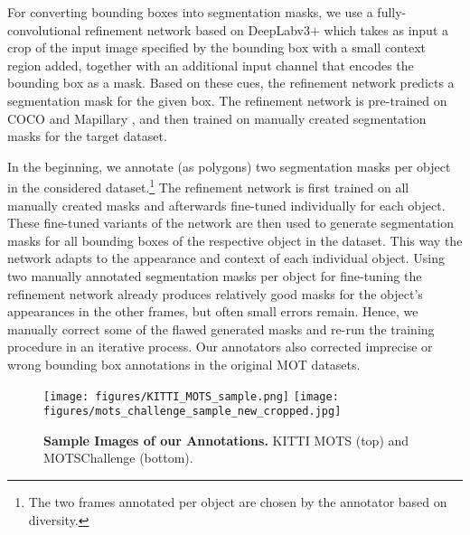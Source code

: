 \documentclass[10pt,twocolumn,letterpaper]{article}
\begin{document}
For converting bounding boxes into segmentation masks, we use a fully-convolutional refinement network \cite{Luiten18ACCV} based on DeepLabv3+ \cite{Chen18ECCV} which takes as input a crop of the input image specified by the bounding box with a small context region added, together with an additional input channel that encodes the bounding box as a mask. Based on these cues, the refinement network predicts a segmentation mask for the given box. The refinement network is pre-trained on COCO \cite{coco} and Mapillary \cite{neuhold2017mapillary}, and then trained on manually created segmentation masks for the target dataset.

In the beginning, we annotate (as polygons) two segmentation masks per object in the considered dataset.\footnote{The two frames annotated per object are chosen by the annotator based on diversity.} The refinement network is first trained on all manually created masks and afterwards fine-tuned individually for each object. These fine-tuned variants of the network are then used to generate segmentation masks for all bounding boxes of the respective object in the dataset. 
This way the network adapts to the appearance and context of each individual object.
Using two manually annotated segmentation masks per object for fine-tuning the refinement network already produces relatively good masks for the object's appearances in the other frames, but often small errors remain. Hence, we manually correct some of the flawed generated masks and re-run the training procedure in an iterative process.
Our annotators also corrected imprecise or wrong bounding box annotations in the original MOT datasets.



\begin{figure}[t]
\texttt{[image: figures/KITTI\_MOTS\_sample.png]}
\vspace{2pt}
\texttt{[image: figures/mots\_challenge\_sample\_new\_cropped.jpg]}
\caption{\label{fig:kitti-and-mot-samples} \textbf{Sample Images of our Annotations.} KITTI MOTS (top) and MOTSChallenge (bottom).}
\end{figure}
\end{document}
